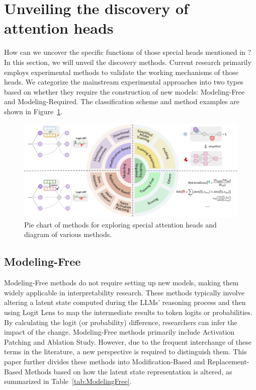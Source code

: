 \documentclass[12pt,letterpaper]{article}
\begin{document}


\section*{Unveiling the discovery of attention heads} \label{sec:DiscoveryExp}
How can we uncover the specific functions of those special heads mentioned in ? In this section, we will unveil the discovery methods. Current research primarily employs experimental methods to validate the working mechanisms of those heads. We categorize the mainstream experimental approaches into two types based on whether they require the construction of new models: Modeling-Free and Modeling-Required. The classification scheme and method examples are shown in Figure~\ref{fig:piechart}.

\begin{figure}[htbp]
    \centering
    \includegraphics[width=\linewidth]{figures/piechart.pdf}
    \caption{Pie chart of methods for exploring special attention heads and diagram of various methods.}
    \label{fig:piechart}
\end{figure}


\subsection*{Modeling-Free} \label{subsec:ModelFree}

Modeling-Free methods do not require setting up new models, making them widely applicable in interpretability research. These methods typically involve altering a latent state computed during the LLMs' reasoning process and then using Logit Lens to map the intermediate results to token logits or probabilities. By calculating the logit (or probability) difference, researchers can infer the impact of the change. Modeling-Free methods primarily include Activation Patching and Ablation Study. However, due to the frequent interchange of these terms in the literature, a new perspective is required to distinguish them. This paper further divides these methods into Modification-Based and Replacement-Based Methods based on how the latent state representation is altered, as summarized in Table~\ref{tab:ModelingFree}.
\end{document}
